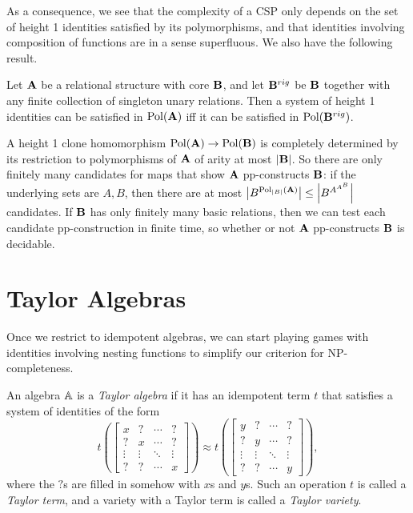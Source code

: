 \documentclass[letterpaper,11pt]{article}
\DeclareMathOperator{\Pol}{Pol}
\begin{document}
As a consequence, we see that the complexity of a CSP only depends on the set of height 1 identities satisfied by its polymorphisms, and that identities involving composition of functions are in a sense superfluous. We also have the following result.

\begin{cor} Let $\mathbf{A}$ be a relational structure with core $\mathbf{B}$, and let $\mathbf{B}^{rig}$ be $\mathbf{B}$ together with any finite collection of singleton unary relations. Then a system of height 1 identities can be satisfied in $\Pol(\fA)$ iff it can be satisfied in $\Pol(\fB^{rig})$.
\end{cor}

\begin{rem} A height 1 clone homomorphism $\Pol(\fA) \rightarrow \Pol(\fB)$ is completely determined by its restriction to polymorphisms of $\mathbf{A}$ of arity at most $|\mathbf{B}|$. So there are only finitely many candidates for maps that show $\mathbf{A}$ pp-constructs $\mathbf{B}$: if the underlying sets are $A,B$, then there are at most $\left|B^{\Pol_{|B|}(\fA)}\right| \le \left|B^{A^{A^B}}\right|$ candidates. If $\mathbf{B}$ has only finitely many basic relations, then we can test each candidate pp-construction in finite time, so whether or not $\mathbf{A}$ pp-constructs $\mathbf{B}$ is decidable.
\end{rem}


\section{Taylor Algebras}

Once we restrict to idempotent algebras, we can start playing games with identities involving nesting functions to simplify our criterion for NP-completeness.

\begin{defn} An algebra $\mathbb{A}$ is a \emph{Taylor algebra} if it has an idempotent term $t$ that satisfies a system of identities of the form
\[
t\left(\begin{bmatrix} x & ? & \cdots & ? \\ ? & x & \cdots & ? \\ \vdots & \vdots & \ddots & \vdots \\ ? & ? & \cdots & x \end{bmatrix}\right) \approx t\left(\begin{bmatrix} y & ? & \cdots & ? \\ ? & y & \cdots & ? \\ \vdots & \vdots & \ddots & \vdots \\ ? & ? & \cdots & y \end{bmatrix}\right),
\]
where the $?$s are filled in somehow with $x$s and $y$s. Such an operation $t$ is called a \emph{Taylor term}, and a variety with a Taylor term is called a \emph{Taylor variety}.
\end{defn}
\end{document}
